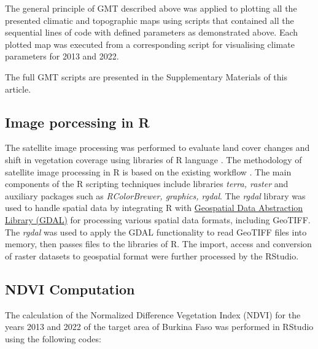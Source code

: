 \documentclass[knowledge,article,submit,pdftex,moreauthors]{Definitions/mdpi}
\begin{document}
The general principle of GMT described above was applied to plotting all the presented climatic and topographic maps using scripts that contained all the sequential lines of code with defined parameters as demonstrated above. Each plotted map was executed from a corresponding script for visualising climate parameters for 2013 and 2022. 

The full GMT scripts are presented in the Supplementary Materials of this article.    

\subsection{Image porcessing in R}
The satellite image processing was performed to evaluate land cover changes and shift in vegetation coverage using libraries of R language \cite{RCoreTeam}. The methodology of satellite image processing in R is based on the existing workflow \cite{jimaging8120317,app122412554}. The main components of the R scripting techniques include libraries \emph{terra, raster} and auxiliary packages such as \emph{RColorBrewer, graphics, rgdal}. The \emph{rgdal} library was used to handle spatial data by integrating R with \href{https://gdal.org/}{Geospatial Data Abstraction Library (GDAL)} for processing various spatial data formats, including GeoTIFF. The \emph{rgdal} was used to apply the GDAL functionality to read GeoTIFF files into memory, then passes files to the libraries of R. The import, access and conversion of raster datasets to geospatial format were further processed by the RStudio. 
 
 \subsection{NDVI Computation}
 
The calculation of the Normalized Difference Vegetation Index (NDVI) for the years 2013 and 2022 of the target area of Burkina Faso was performed in RStudio using the following codes: 
 
\end{document}
